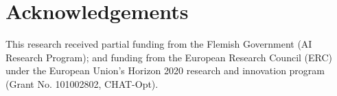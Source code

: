 \documentclass[letterpaper]{article} %
\begin{document}
\clearpage
\section{Acknowledgements}
This research received partial funding from the Flemish Government (AI Research Program); and funding from the European Research Council (ERC) under the European Union’s Horizon 2020 research and innovation program (Grant No. 101002802, CHAT-Opt).


  
\end{document}
